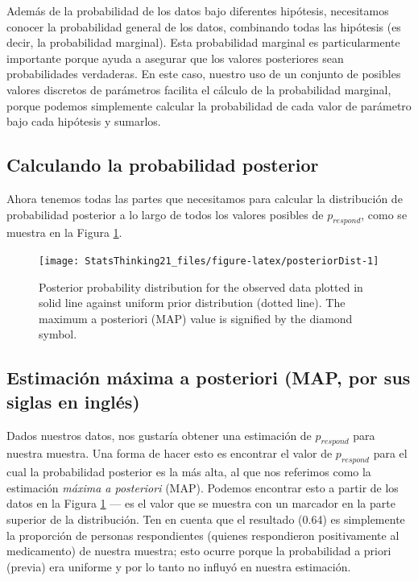 \documentclass[
  12pt,
]{book}
\begin{document}
Además de la probabilidad de los datos bajo diferentes hipótesis, necesitamos conocer la probabilidad general de los datos, combinando todas las hipótesis (es decir, la probabilidad marginal). Esta probabilidad marginal es particularmente importante porque ayuda a asegurar que los valores posteriores sean probabilidades verdaderas. En este caso, nuestro uso de un conjunto de posibles valores discretos de parámetros facilita el cálculo de la probabilidad marginal, porque podemos simplemente calcular la probabilidad de cada valor de parámetro bajo cada hipótesis y sumarlos.

\hypertarget{calculando-la-probabilidad-posterior}{%
\subsection{Calculando la probabilidad posterior}\label{calculando-la-probabilidad-posterior}}

Ahora tenemos todas las partes que necesitamos para calcular la distribución de probabilidad posterior a lo largo de todos los valores posibles de \(p_{respond}\), como se muestra en la Figura \ref{fig:posteriorDist}.

\begin{figure}
\texttt{[image: StatsThinking21\_files/figure-latex/posteriorDist-1]} \caption{Posterior probability distribution for the observed data plotted in solid line against uniform prior distribution (dotted line). The maximum a posteriori (MAP) value is signified by the diamond symbol.}\label{fig:posteriorDist}
\end{figure}

\hypertarget{estimaciuxf3n-muxe1xima-a-posteriori-map-por-sus-siglas-en-ingluxe9s}{%
\subsection{Estimación máxima a posteriori (MAP, por sus siglas en inglés)}\label{estimaciuxf3n-muxe1xima-a-posteriori-map-por-sus-siglas-en-ingluxe9s}}

Dados nuestros datos, nos gustaría obtener una estimación de \(p_{respond}\) para nuestra muestra. Una forma de hacer esto es encontrar el valor de \(p_{respond}\) para el cual la probabilidad posterior es la más alta, al que nos referimos como la estimación \emph{máxima a posteriori} (MAP). Podemos encontrar esto a partir de los datos en la Figura \ref{fig:posteriorDist} --- es el valor que se muestra con un marcador en la parte superior de la distribución. Ten en cuenta que el resultado (0.64) es simplemente la proporción de personas respondientes (quienes respondieron positivamente al medicamento) de nuestra muestra; esto ocurre porque la probabilidad a priori (previa) era uniforme y por lo tanto no influyó en nuestra estimación.
\end{document}
